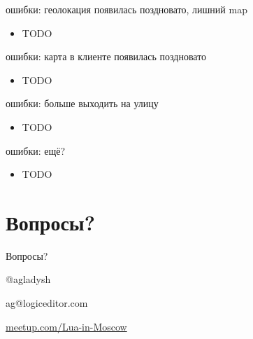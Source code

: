 \documentclass[aspectratio=169,handout,bigger]{beamer}
\begin{document}

\begin{frame}{ошибки: геолокация появилась поздновато, лишний map}
  \begin{itemize}
    \item TODO
  \end{itemize}
\end{frame}


\begin{frame}{ошибки: карта в клиенте появилась поздновато}
  \begin{itemize}
    \item TODO
  \end{itemize}
\end{frame}


\begin{frame}{ошибки: больше выходить на улицу}
  \begin{itemize}
    \item TODO
  \end{itemize}
\end{frame}


\begin{frame}{ошибки: ещё?}
  \begin{itemize}
    \item TODO
  \end{itemize}
\end{frame}


\section{Вопросы?}

\begin{frame}{Вопросы?}

\begin{center}
\Huge{@agladysh}
\end{center}

\begin{center}
\Large{ag@logiceditor.com}
\end{center}

\begin{center}
\href{http://meetup.com/Lua-in-Moscow}{meetup.com/Lua-in-Moscow}
\end{center}

\end{frame}

\end{document}
